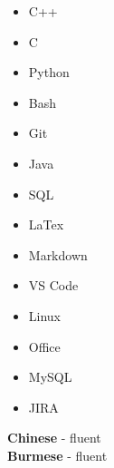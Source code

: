 \documentclass[9pt]{developercv} %
\begin{document}

\begin{minipage}[t]{0.3\textwidth} %
	\vspace{-\baselineskip} %
	\begin{itemize}
		\item C++
		\item C
		\item Python
		\item Bash
		\item Git
	\end{itemize}
\end{minipage}
\hfill %
\begin{minipage}[t]{0.3\textwidth} %
	\vspace{-\baselineskip} %
	\begin{itemize}
		\item Java
		\item SQL
		\item LaTex
		\item Markdown
	\end{itemize}
\end{minipage}
\hfill %
\begin{minipage}[t]{0.3\textwidth} %
	\vspace{-\baselineskip} %
	\begin{itemize}
	    \item VS Code
	    \item Linux
	    \item Office
	    \item MySQL
	    \item JIRA
	\end{itemize}
\end{minipage}

\vskip 0.35in

\begin{minipage}[t]{0.3\textwidth}
	\vspace{-\baselineskip} %
    
	
	\textbf{Chinese} - fluent\\
	\textbf{Burmese} - fluent
\end{minipage}
    
\end{document}
